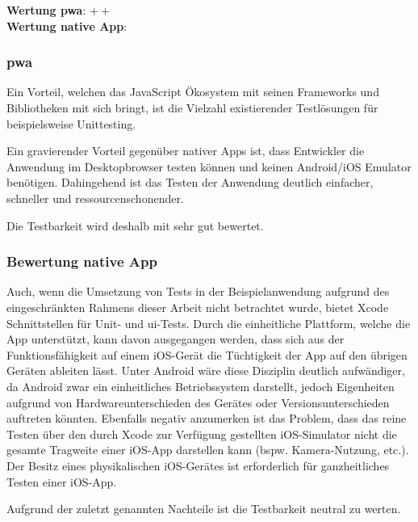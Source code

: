 \textbf{Wertung \ac{pwa}}: $++$\\
\textbf{Wertung native App}: \Circle \\
\subsubsection{\ac{pwa}}
Ein Vorteil, welchen das JavaScript Ökosystem mit seinen Frameworks und Bibliotheken mit sich bringt, ist die Vielzahl existierender Testlösungen für beispielsweise Unittesting.

Ein gravierender Vorteil gegenüber nativer Apps ist, dass Entwickler die Anwendung im Desktopbrowser testen können und keinen Android/iOS Emulator benötigen. Dahingehend ist das Testen der Anwendung deutlich einfacher, schneller und ressourcenschonender.

Die Testbarkeit wird deshalb mit sehr gut bewertet.

\subsubsection{Bewertung native App}
Auch, wenn die Umsetzung von Tests in der Beispielanwendung aufgrund des eingeschränkten Rahmens dieser Arbeit nicht betrachtet wurde, bietet Xcode Schnittstellen für Unit- und \ac{ui}-Tests. Durch die einheitliche Plattform, welche die App unterstützt, kann davon ausgegangen werden, dass sich aus der Funktionsfähigkeit auf einem iOS-Gerät die Tüchtigkeit der App auf den übrigen Geräten ableiten lässt. Unter Android wäre diese Disziplin deutlich aufwändiger, da Android zwar ein einheitliches Betriebssystem darstellt, jedoch Eigenheiten aufgrund von Hardwareunterschieden des Gerätes oder Versionsunterschieden auftreten könnten. Ebenfalls negativ anzumerken ist das Problem, dass das reine Testen über den durch Xcode zur Verfügung gestellten iOS-Simulator nicht die gesamte Tragweite einer iOS-App darstellen kann (bspw. Kamera-Nutzung, etc.). Der Besitz eines physikalischen iOS-Gerätes ist erforderlich für ganzheitliches Testen einer iOS-App.

Aufgrund der zuletzt genannten Nachteile ist die Testbarkeit neutral zu werten.